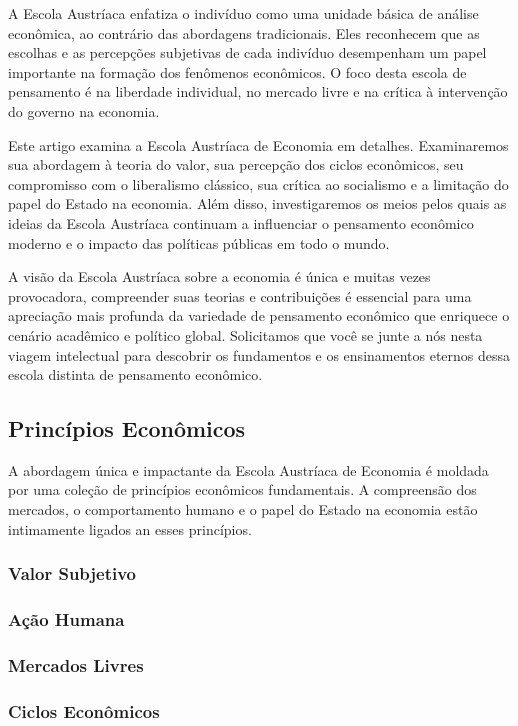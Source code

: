 \documentclass[a4paper,12pt]{article}
\begin{document}
A Escola Austríaca enfatiza o indivíduo como uma unidade básica de análise econômica, ao contrário 
das abordagens tradicionais. Eles reconhecem que as escolhas e as percepções subjetivas de cada indivíduo 
desempenham um papel importante na formação dos fenômenos econômicos. O foco desta escola de pensamento 
é na liberdade individual, no mercado livre e na crítica à intervenção do governo na economia.

Este artigo examina a Escola Austríaca de Economia em detalhes. Examinaremos sua abordagem à teoria do valor,
sua percepção dos ciclos econômicos, seu compromisso com o liberalismo clássico, sua crítica ao socialismo e
a limitação do papel do Estado na economia. Além disso, investigaremos os meios pelos quais as ideias da Escola 
Austríaca continuam a influenciar o pensamento econômico moderno e o impacto das políticas públicas em todo o 
mundo.

A visão da Escola Austríaca sobre a economia é única e muitas vezes provocadora, compreender suas teorias e 
contribuições é essencial para uma apreciação mais profunda da variedade de pensamento econômico que enriquece 
o cenário acadêmico e político global. Solicitamos que você se junte a nós nesta viagem intelectual para descobrir 
os fundamentos e os ensinamentos eternos dessa escola distinta de pensamento econômico.

\subsection{Princ\'ipios Econ\^omicos}

\hspace{0.5cm}A abordagem única e impactante da Escola Austríaca de Economia é moldada por uma coleção de 
princípios econômicos fundamentais. A compreensão dos mercados, o comportamento humano e o papel do Estado 
na economia estão intimamente ligados an esses princípios.

\subsubsection{Valor Subjetivo}
\subsubsection{Ação Humana}
\subsubsection{Mercados Livres }
\subsubsection{Ciclos Econômicos } 
\end{document}
